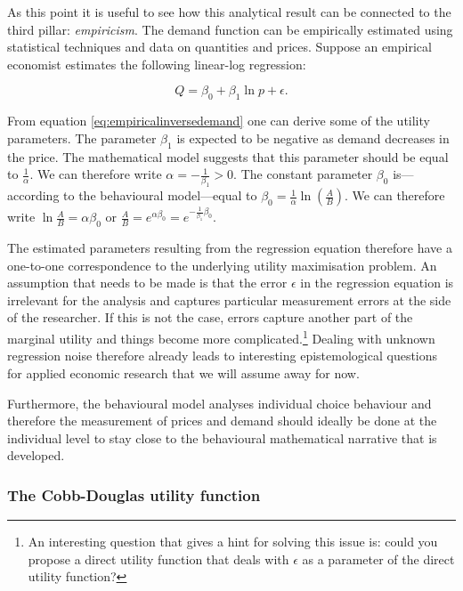 \documentclass[
]{book}
\begin{document}
As this point it is useful to see how this analytical result can be connected to the third pillar: \emph{empiricism}. The demand function can be empirically estimated using statistical techniques and data on quantities and prices. Suppose an empirical economist estimates the following linear-log regression:

\begin{equation}
Q = \beta_0 + \beta_1 \ln p + \epsilon.
\label{eq:empiricalinversedemand}
\end{equation}

From equation \eqref{eq:empiricalinversedemand} one can derive some of the utility parameters. The parameter \(\beta_1\) is expected to be negative as demand decreases in the price. The mathematical model suggests that this parameter should be equal to \(\frac{1}{\alpha}\). We can therefore write \(\alpha = -\frac{1}{\beta_1} > 0\). The constant parameter \(\beta_0\) is---according to the behavioural model---equal to \(\beta_0 = \frac{1}{\alpha}\ln(\frac{A}{B})\). We can therefore write \(\ln \frac{A}{B} = \alpha \beta_0\) or \(\frac{A}{B} = e^{\alpha \beta_0} = e^{-\frac{1}{\beta_1}\beta_0}\).

The estimated parameters resulting from the regression equation therefore have a one-to-one correspondence to the underlying utility maximisation problem. An assumption that needs to be made is that the error \(\epsilon\) in the regression equation is irrelevant for the analysis and captures particular measurement errors at the side of the researcher. If this is not the case, errors capture another part of the marginal utility and things become more complicated.\footnote{An interesting question that gives a hint for solving this issue is: could you propose a direct utility function that deals with \(\epsilon\) as a parameter of the direct utility function?} Dealing with unknown regression noise therefore already leads to interesting epistemological questions for applied economic research that we will assume away for now.

Furthermore, the behavioural model analyses individual choice behaviour and therefore the measurement of prices and demand should ideally be done at the individual level to stay close to the behavioural mathematical narrative that is developed.

\hypertarget{cobb-douglas}{%
\subsubsection{The Cobb-Douglas utility function}\label{cobb-douglas}}
\end{document}
